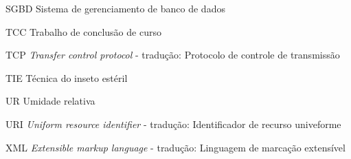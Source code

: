 \begin{siglas}
	\item[SGBD]		Sistema de gerenciamento de banco de dados
	\item[TCC]      Trabalho de conclusão de curso
    \item[TCP]		\textit{Transfer control protocol} - tradução: Protocolo de controle de transmissão 
	\item[TIE]		Técnica do inseto estéril
	\item[UR]	    Umidade relativa
	\item[URI]	    \textit{Uniform resource identifier} - tradução: Identificador de recurso univeforme
	\item[XML]      \textit{Extensible markup language} - tradução: Linguagem de marcação extensível
    
\end{siglas}

\tableofcontents*
\cleardoublepage
